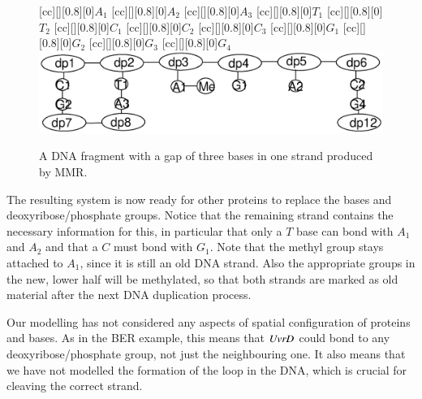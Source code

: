 \begin{figure}[]
[cc][][0.8][0]{${A_1}$}
[cc][][0.8][0]{${A_2}$}
[cc][][0.8][0]{${A_3}$}
[cc][][0.8][0]{${T_1}$}
[cc][][0.8][0]{${T_2}$}
[cc][][0.8][0]{${C_1}$}
[cc][][0.8][0]{${C_2}$}
[cc][][0.8][0]{${C_3}$}
[cc][][0.8][0]{${G_1}$}
[cc][][0.8][0]{${G_2}$}
[cc][][0.8][0]{${G_3}$}
[cc][][0.8][0]{${G_4}$}
  \centering
    \includegraphics[width=1.0\textwidth]{mmr/state7}\vspace{-1cm}
  \caption[A six base pair DNA fragment.]{A DNA fragment with a gap of three bases in one strand produced by MMR.}
  \label{fig:state7}
\end{figure}
The resulting system is now ready for other proteins to replace the bases and deoxyribose/phosphate groups. Notice that the remaining strand contains the necessary information for this, in particular that only a $T$ base can bond with $A_1$ and $A_2$ and that a $C$ must bond with $G_1$. Note that the methyl group stays attached to $A_1$, since it is still an old DNA strand. Also the appropriate groups in the new, lower half will be methylated, so that both strands are marked as old material after the next DNA duplication process.

Our modelling has not considered any aspects of spatial configuration of proteins and bases. As in the BER example,
this means that $\mathit{UvrD}$ could bond to any deoxyribose/phosphate group, not just the neighbouring one. It also means that we have not modelled the formation of the loop in the DNA, which is crucial for cleaving the correct strand.


